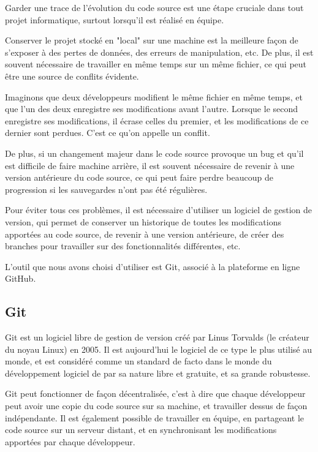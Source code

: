 \documentclass[12pt]{scrreprt} %
\begin{document}
Garder une trace de l'évolution du code source est une étape cruciale dans tout projet informatique, surtout lorsqu'il est réalisé en équipe.

Conserver le projet stocké en "local" sur une machine est la meilleure façon de s'exposer à des pertes de données, des erreurs de manipulation, etc. De plus, il est souvent nécessaire de travailler en même temps sur un même fichier, ce qui peut être une source de conflits évidente.

Imaginons que deux développeurs modifient le même fichier en même temps, et que l'un des deux enregistre ses modifications avant l'autre. Lorsque le second enregistre ses modifications, il écrase celles du premier, et les modifications de ce dernier sont perdues. C'est ce qu'on appelle un conflit.

De plus, si un changement majeur dans le code source provoque un bug et qu'il est difficile de faire machine arrière, il est souvent nécessaire de revenir à une version antérieure du code source, ce qui peut faire perdre beaucoup de progression si les sauvegardes n'ont pas été régulières.

Pour éviter tous ces problèmes, il est nécessaire d'utiliser un logiciel de gestion de version, qui permet de conserver un historique de toutes les modifications apportées au code source, de revenir à une version antérieure, de créer des branches pour travailler sur des fonctionnalités différentes, etc.

L'outil que nous avons choisi d'utiliser est Git\cite{Git2024}, associé à la plateforme en ligne GitHub\cite{GitHub2024}.

\subsection{Git}

Git est un logiciel libre de gestion de version créé par Linus Torvalds (le créateur du noyau Linux) en 2005. Il est aujourd'hui le logiciel de ce type le plus utilisé au monde, et est considéré comme un standard de facto dans le monde du développement logiciel de par sa nature libre et gratuite, et sa grande robustesse.

Git peut fonctionner de façon décentralisée, c'est à dire que chaque développeur peut avoir une copie du code source sur sa machine, et travailler dessus de façon indépendante. Il est également possible de travailler en équipe, en partageant le code source sur un serveur distant, et en synchronisant les modifications apportées par chaque développeur.
\end{document}
